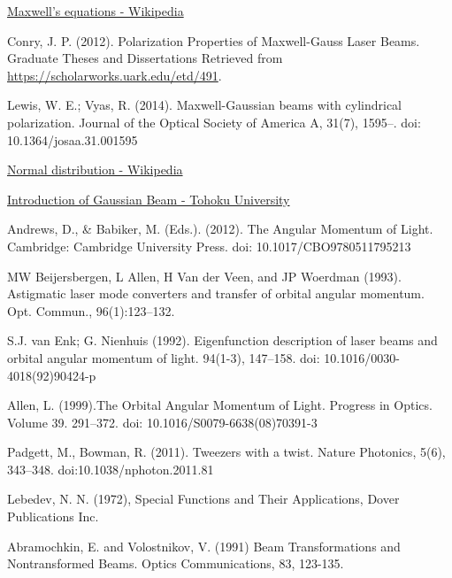 \documentclass[11pt,a4paper]{article}
\numberwithin{equation}{section}
\begin{document}
\begin{thebibliography}{999}
	\href{https://en.wikipedia.org/wiki/Maxwell's_equations}{Maxwell's equations - Wikipedia}
	
	
	Conry, J. P. (2012). Polarization Properties of Maxwell-Gauss Laser Beams. Graduate Theses and Dissertations Retrieved from \href{https://scholarworks.uark.edu/etd/491}{https://scholarworks.uark.edu/etd/491}.
	
	 Lewis, W. E.; Vyas, R. (2014). Maxwell-Gaussian beams with cylindrical polarization. Journal of the Optical Society of America A, 31(7), 1595–. doi: 10.1364/josaa.31.001595 
	
	\href{https://en.wikipedia.org/wiki/Normal_distribution}{Normal distribution - Wikipedia}
	
	\href{https://flex.phys.tohoku.ac.jp/~rsaito/saito20-GaussianBeam.pdf}{Introduction of Gaussian Beam - Tohoku University}
	
	Andrews, D., \& Babiker, M. (Eds.). (2012). The Angular Momentum of Light. Cambridge: Cambridge University Press. doi: 10.1017/CBO9780511795213
	
	
	MW Beijersbergen, L Allen, H Van der Veen, and JP Woerdman (1993). Astigmatic laser mode converters and transfer of orbital angular momentum. Opt. Commun., 96(1):123–132.
	
	 S.J. van Enk; G. Nienhuis (1992). Eigenfunction description of laser beams and orbital angular momentum of light. 94(1-3), 147–158. doi: 10.1016/0030-4018(92)90424-p     
	 
	 Allen, L. (1999).The Orbital Angular Momentum of Light. Progress in Optics.  Volume 39. 291–372. doi: 10.1016/S0079-6638(08)70391-3
	 
	 Padgett, M., Bowman, R. (2011). Tweezers with a twist. Nature Photonics, 5(6), 343–348. doi:10.1038/nphoton.2011.81 
	 
	 Lebedev, N. N. (1972), Special Functions and Their Applications, Dover Publications Inc.
	 
	 Abramochkin, E. and Volostnikov, V. (1991) Beam Transformations and Nontransformed Beams. Optics Communications, 83, 123-135. 
	 

\end{thebibliography}
\end{document}

